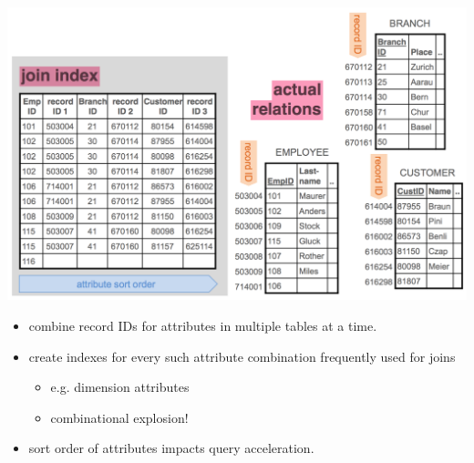 \begin{breakbox}
\begin{center}
\includegraphics[width=.15\textwidth]{slides_images/join_indexes.png}
\end{center}
\begin{itemize}
	\item combine record IDs for attributes in multiple tables at a time.
	\item create indexes for every such attribute combination frequently used for joins
	\begin{itemize}
		\item e.g. dimension attributes
		\item combinational explosion!
	\end{itemize}
	\item sort order of attributes impacts query acceleration.
\end{itemize}
\end{breakbox}

















